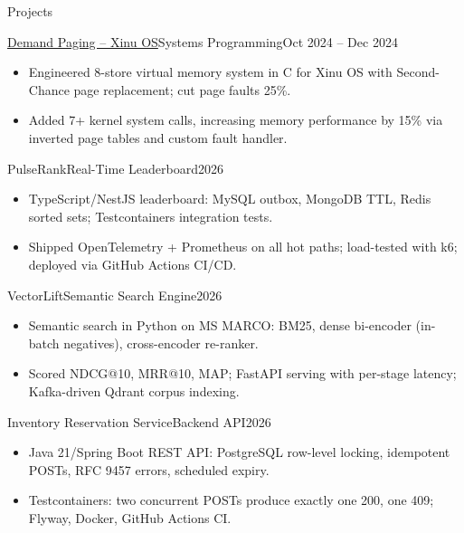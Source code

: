 \documentclass[]{mcdowellcv}
\begin{document}
\begin{cvsection}{Projects}
  \begin{cvsubsection}{\href{https://github.com/ncsu-csc-501/project3-mndedhia_akulka26_aapai}{Demand Paging -- Xinu OS}}{Systems Programming}{Oct 2024 -- Dec 2024}
    \begin{itemize}
      \item Engineered 8-store virtual memory system in C for Xinu OS with Second-Chance page replacement; cut page faults 25\%.
      \item Added 7+ kernel system calls, increasing memory performance by 15\% via inverted page tables and custom fault handler.
    \end{itemize}
    \vspace{-1.5pt}
  \end{cvsubsection}

  \begin{cvsubsection}{PulseRank}{Real-Time Leaderboard}{2026}
    \begin{itemize}
      \item TypeScript/NestJS leaderboard: MySQL outbox, MongoDB TTL, Redis sorted sets; Testcontainers integration tests.
      \item Shipped OpenTelemetry + Prometheus on all hot paths; load-tested with k6; deployed via GitHub Actions CI/CD.
    \end{itemize}
    \vspace{-1.5pt}
  \end{cvsubsection}

  \begin{cvsubsection}{VectorLift}{Semantic Search Engine}{2026}
    \begin{itemize}
      \item Semantic search in Python on MS MARCO: BM25, dense bi-encoder (in-batch negatives), cross-encoder re-ranker.
      \item Scored NDCG@10, MRR@10, MAP; FastAPI serving with per-stage latency; Kafka-driven Qdrant corpus indexing.
    \end{itemize}
    \vspace{-1.5pt}
  \end{cvsubsection}

  \begin{cvsubsection}{Inventory Reservation Service}{Backend API}{2026}
    \begin{itemize}
      \item Java 21/Spring Boot REST API: PostgreSQL row-level locking, idempotent POSTs, RFC 9457 errors, scheduled expiry.
      \item Testcontainers: two concurrent POSTs produce exactly one 200, one 409; Flyway, Docker, GitHub Actions CI.
    \end{itemize}
  \end{cvsubsection}
\end{cvsection}
\end{document}
